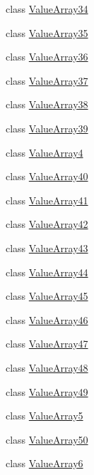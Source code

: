 \begin{DoxyCompactItemize}
\item 
class \mbox{\hyperlink{classtesting_1_1internal_1_1_value_array34}{Value\+Array34}}
\item 
class \mbox{\hyperlink{classtesting_1_1internal_1_1_value_array35}{Value\+Array35}}
\item 
class \mbox{\hyperlink{classtesting_1_1internal_1_1_value_array36}{Value\+Array36}}
\item 
class \mbox{\hyperlink{classtesting_1_1internal_1_1_value_array37}{Value\+Array37}}
\item 
class \mbox{\hyperlink{classtesting_1_1internal_1_1_value_array38}{Value\+Array38}}
\item 
class \mbox{\hyperlink{classtesting_1_1internal_1_1_value_array39}{Value\+Array39}}
\item 
class \mbox{\hyperlink{classtesting_1_1internal_1_1_value_array4}{Value\+Array4}}
\item 
class \mbox{\hyperlink{classtesting_1_1internal_1_1_value_array40}{Value\+Array40}}
\item 
class \mbox{\hyperlink{classtesting_1_1internal_1_1_value_array41}{Value\+Array41}}
\item 
class \mbox{\hyperlink{classtesting_1_1internal_1_1_value_array42}{Value\+Array42}}
\item 
class \mbox{\hyperlink{classtesting_1_1internal_1_1_value_array43}{Value\+Array43}}
\item 
class \mbox{\hyperlink{classtesting_1_1internal_1_1_value_array44}{Value\+Array44}}
\item 
class \mbox{\hyperlink{classtesting_1_1internal_1_1_value_array45}{Value\+Array45}}
\item 
class \mbox{\hyperlink{classtesting_1_1internal_1_1_value_array46}{Value\+Array46}}
\item 
class \mbox{\hyperlink{classtesting_1_1internal_1_1_value_array47}{Value\+Array47}}
\item 
class \mbox{\hyperlink{classtesting_1_1internal_1_1_value_array48}{Value\+Array48}}
\item 
class \mbox{\hyperlink{classtesting_1_1internal_1_1_value_array49}{Value\+Array49}}
\item 
class \mbox{\hyperlink{classtesting_1_1internal_1_1_value_array5}{Value\+Array5}}
\item 
class \mbox{\hyperlink{classtesting_1_1internal_1_1_value_array50}{Value\+Array50}}
\item 
class \mbox{\hyperlink{classtesting_1_1internal_1_1_value_array6}{Value\+Array6}}

\end{DoxyCompactItemize}
